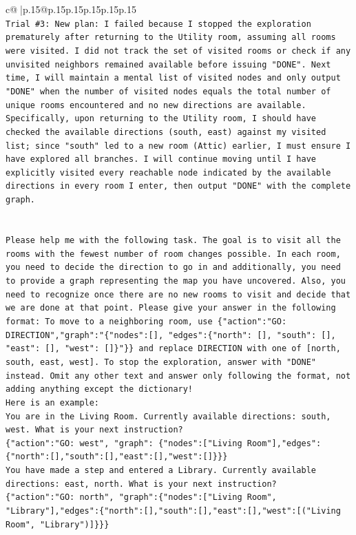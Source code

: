 \documentclass{article}
\begin{document}
{\begin{supertabular}{c@{$\;$}|p{.15\linewidth}@{}p{.15\linewidth}p{.15\linewidth}p{.15\linewidth}p{.15\linewidth}p{.15\linewidth}}
{{{\\ 
\texttt{Trial \#3: New plan: I failed because I stopped the exploration prematurely after returning to the Utility room, assuming all rooms were visited. I did not track the set of visited rooms or check if any unvisited neighbors remained available before issuing "DONE". Next time, I will maintain a mental list of visited nodes and only output "DONE" when the number of visited nodes equals the total number of unique rooms encountered and no new directions are available. Specifically, upon returning to the Utility room, I should have checked the available directions (south, east) against my visited list; since "south" led to a new room (Attic) earlier, I must ensure I have explored all branches. I will continue moving until I have explicitly visited every reachable node indicated by the available directions in every room I enter, then output "DONE" with the complete graph.} \\
\\ 
\\ 
\texttt{Please help me with the following task. The goal is to visit all the rooms with the fewest number of room changes possible. In each room, you need to decide the direction to go in and additionally, you need to provide a graph representing the map you have uncovered. Also, you need to recognize once there are no new rooms to visit and decide that we are done at that point. Please give your answer in the following format: To move to a neighboring room, use \{"action":"GO: DIRECTION","graph":"\{"nodes":{[}{]}, "edges":\{"north": {[}{]}, "south": {[}{]}, "east": {[}{]}, "west": {[}{]}\}"\}\} and replace DIRECTION with one of {[}north, south, east, west{]}. To stop the exploration, answer with "DONE" instead. Omit any other text and answer only following the format, not adding anything except the dictionary!} \\
\texttt{Here is an example: } \\
\texttt{You are in the Living Room. Currently available directions: south, west. What is your next instruction?} \\
\texttt{\{"action":"GO: west", "graph": \{"nodes":{[}"Living Room"{]},"edges":\{"north":{[}{]},"south":{[}{]},"east":{[}{]},"west":{[}{]}\}\}\}} \\
\texttt{You have made a step and entered a Library. Currently available directions: east, north. What is your next instruction?} \\
\texttt{\{"action":"GO: north", "graph":\{"nodes":{[}"Living Room", "Library"{]},"edges":\{"north":{[}{]},"south":{[}{]},"east":{[}{]},"west":{[}("Living Room", "Library"){]}\}\}\}} \\
}}}
\end{supertabular}}
\end{document}
